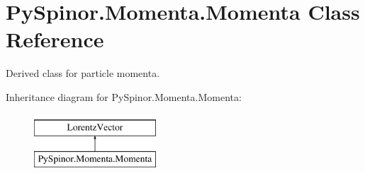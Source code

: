 \hypertarget{class_py_spinor_1_1_momenta_1_1_momenta}{}\section{Py\+Spinor.\+Momenta.\+Momenta Class Reference}
\label{class_py_spinor_1_1_momenta_1_1_momenta}


Derived class for particle momenta.  


Inheritance diagram for Py\+Spinor.\+Momenta.\+Momenta\+:\begin{figure}[H]
\begin{center}
\leavevmode
\includegraphics[height=2.000000cm]{class_py_spinor_1_1_momenta_1_1_momenta}
\end{center}
\end{figure}
